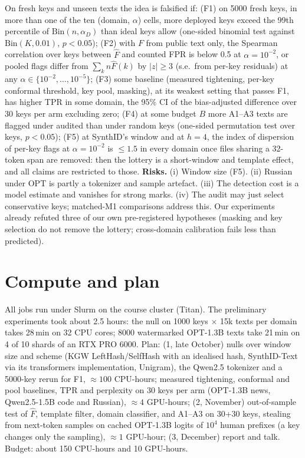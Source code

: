 \documentclass{article}
\theoremstyle{plain}
\newcommand{\Bin}{\mathrm{Bin}}
\begin{document}
On fresh keys and unseen texts the idea is falsified if: (F1) on 5000 fresh keys, in more than one of the ten (domain, $\alpha$) cells, more deployed keys exceed the 99th percentile of $\Bin(n,\alpha_D)$ than ideal keys allow (one-sided binomial test against $\Bin(K,0.01)$, $p<0.05$); (F2) with $F$ from public text only, the Spearman correlation over keys between $\hat F$ and counted FPR is below 0.5 at $\alpha=10^{-2}$, or pooled flags differ from $\sum_kn\hat F(k)$ by $|z|\ge3$ (s.e.\ from per-key residuals) at any $\alpha\in\{10^{-2},\dots,10^{-5}\}$; (F3) some baseline (measured tightening, per-key conformal threshold, key pool, masking), at its weakest setting that passes F1, has higher TPR in some domain, the 95\% CI of the bias-adjusted difference over 30 keys per arm excluding zero; (F4) at some budget $B$ more A1--A3 texts are flagged under audited than under random keys (one-sided permutation test over keys, $p<0.05$); (F5) at SynthID's window and at $h=4$, the index of dispersion of per-key flags at $\alpha=10^{-2}$ is ${\le}1.5$ in every domain once files sharing a 32-token span are removed: then the lottery is a short-window and template effect, and all claims are restricted to those.
\textbf{Risks.} (i) Window size (F5). (ii) Russian under OPT is partly a tokenizer and sample artefact. (iii) The detection cost is a model estimate and vanishes for strong marks. (iv) The audit may just select conservative keys; matched-M1 comparisons address this. Our experiments already refuted three of our own pre-registered hypotheses (masking and key selection do not remove the lottery; cross-domain calibration fails less than predicted).

\section{Compute and plan}
\label{sec:compute}

All jobs run under Slurm on the course cluster (Titan). The preliminary experiments took about 2.5 hours: the null on 1000 keys $\times$ 15k texts per domain takes 28\,min on 32 CPU cores; 8000 watermarked OPT-1.3B texts take 21\,min on 4 of 10 shards of an RTX PRO 6000. Plan: (1, late October) nulls over window size and scheme (KGW LeftHash/SelfHash with an idealised hash, SynthID-Text via its transformers implementation, Unigram), the Qwen2.5 tokenizer and a 5000-key rerun for F1, ${\approx}100$ CPU-hours; measured tightening, conformal and pool baselines, TPR and perplexity on 30 keys per arm (OPT-1.3B news, Qwen2.5-1.5B code and Russian), ${\approx}4$ GPU-hours; (2, November) out-of-sample test of $\hat F$, template filter, domain classifier, and A1--A3 on 30+30 keys, stealing from next-token samples on cached OPT-1.3B logits of $10^4$ human prefixes (a key changes only the sampling), ${\approx}1$ GPU-hour; (3, December) report and talk. Budget: about 150 CPU-hours and 10 GPU-hours.



\end{document}
